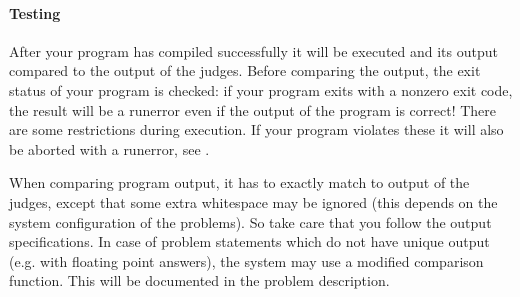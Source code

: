 \documentclass[a4paper,10pt,english,openany]{sphinxmanual}
\begin{document}
\paragraph{Testing}
\label{\detokenize{team:testing}}\label{\detokenize{team:id2}}
\sphinxAtStartPar
After your program has compiled successfully it will be executed and
its output compared to the output of the judges. Before comparing the
output, the exit status of your program is checked: if your program
exits with a non\sphinxhyphen{}zero exit code, the result will be a run\sphinxhyphen{}error
even if the output of the program is correct!
There are some restrictions during execution. If your program violates
these it will also be aborted with a run\sphinxhyphen{}error,
see {\hyperref[\detokenize{team:runlimits}]{}}.

\sphinxAtStartPar
When comparing program output, it has to exactly match to output of
the judges, except that some extra whitespace may be ignored (this
depends on the system configuration of the problems). So take care
that you follow the output specifications. In case of problem
statements which do not have unique output (e.g. with floating point
answers), the system may use a modified comparison function.
This will be documented in the problem description.
\end{document}
